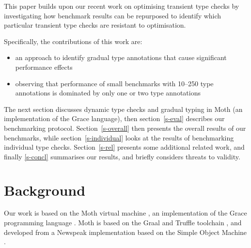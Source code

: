 \documentclass[sigplan,10pt,review,screen]{acmart}\settopmatter{printfolios=true}
\begin{document}
This paper builds upon our recent work on optimising transient
type checks \cite{Roberts2017,roberts-and-co-ecoop-2019} by
investigating how benchmark results can be repurposed to identify which
particular transient type checks are resistant to optimisation.

Specifically, the contributions of this work are:

\begin{itemize}
  \item an approach to identify gradual type annotations
        that cause significant performance effects
  \item observing that performance of small benchmarks
        with 10--250 type annotations is dominated by only
        one or two type annotations
\end{itemize}


The next section discusses dynamic type checks and gradual typing in
Moth (an implementation of the Grace language), then section~\ref{s-eval} describes our benchmarking protocol. Section~\ref{s-overall} then presents the overall results of
our benchmarks, while section~\ref{s-individual}
looks at the results of benchmarking individual type checks.
Section~\ref{s-rel} presents some additional related work, and finally \ref{s-concl} summarises our results, and briefly considers threats to validity.

\section{Background}
\label{s-bg}

Our work is based on the Moth virtual machine 
\cite{Roberts2017,roberts-and-co-ecoop-2019},
an implementation
of the Grace programming language 
\citep{graceOnward12,graceSigcse13}.
Moth is based on the Graal and Truffle toolchain
\cite{Wurthinger:2017:PPE,Wurthinger2013},
and developed from a Newspeak implementation based on the  Simple
Object Machine \cite{Daloze2016,SOMns}.
\end{document}
